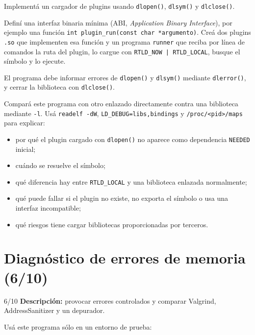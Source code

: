 \documentclass[11pt,a4paper]{article}
\newcommand{\inputcode}[2][]{%
  \par\addvspace{0.2\baselineskip}\noindent
  \begin{minipage}{\linewidth}
    
  \end{minipage}\par\addvspace{0.2\baselineskip}}
\begin{document}
\begin{bonusbox}
Implementá un cargador de plugins usando \texttt{dlopen()}, \texttt{dlsym()}
y \texttt{dlclose()}.

Definí una interfaz binaria mínima (ABI, \emph{Application Binary Interface}),
por ejemplo una función \texttt{int plugin\_run(const char *argumento)}. Creá
dos plugins \texttt{.so} que implementen esa función y un programa
\texttt{runner} que reciba por línea de comandos la ruta del plugin, lo cargue
con \texttt{RTLD\_NOW | RTLD\_LOCAL}, busque el símbolo y lo ejecute.

El programa debe informar errores de \texttt{dlopen()} y \texttt{dlsym()}
mediante \texttt{dlerror()}, y cerrar la biblioteca con \texttt{dlclose()}.

Compará este programa con otro enlazado directamente contra una biblioteca
mediante \texttt{-l}. Usá \texttt{readelf -dW},
\texttt{LD\_DEBUG=libs,bindings} y \texttt{/proc/<pid>/maps} para explicar:
\begin{itemize}[leftmargin=*]
  \item por qué el plugin cargado con \texttt{dlopen()} no aparece como
  dependencia \texttt{NEEDED} inicial;
  \item cuándo se resuelve el símbolo;
  \item qué diferencia hay entre \texttt{RTLD\_LOCAL} y una biblioteca
  enlazada normalmente;
  \item qué puede fallar si el plugin no existe, no exporta el símbolo o usa
  una interfaz incompatible;
  \item qué riesgos tiene cargar bibliotecas proporcionadas por terceros.
\end{itemize}
\end{bonusbox}

\newpage
\section{Diagnóstico de errores de memoria (6/10)}

\begin{trackbox}{6/10}
\textbf{Descripción:} provocar errores controlados y comparar Valgrind,
AddressSanitizer y un depurador.
\end{trackbox}

Usá este programa sólo en un entorno de prueba:

\inputcode[language=C]{../examples/tp3-extra/errores.c}
\end{document}
